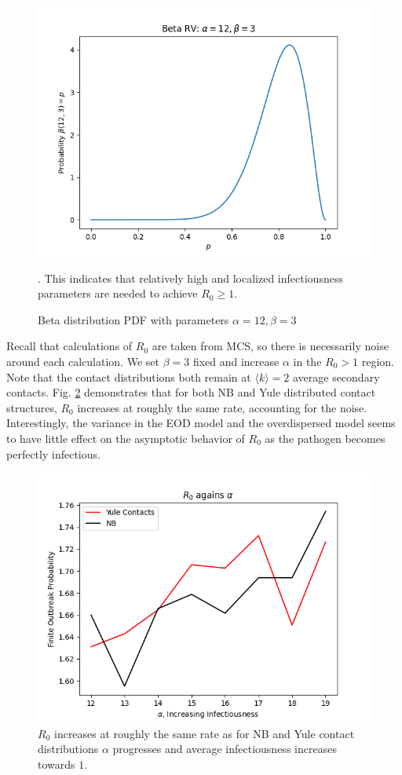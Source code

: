 \documentclass[11pt, twocolumn]{article}
\begin{document}
\begin{figure}
	\centering
	\includegraphics[scale=0.5]{betadist.png}
	\caption{Beta distribution PDF with parameters $\alpha=12, \beta=3$}. This indicates that relatively high and localized infectiousness parameters are needed to achieve $R_0\geq 1$.
	\label{fig:betadist}
\end{figure}

Recall that calculations of $R_0$ are taken from MCS, so there is necessarily noise around each calculation. We set $\beta=3$ fixed and increase $\alpha$ in the $R_0>1$ region. Note that the contact distributions both remain at $\langle k \rangle = 2$ average secondary contacts. Fig. \ref{fig:r0prog} demonstrates that for both NB and Yule distributed contact structures, $R_0$ increases at roughly the same rate, accounting for the noise. Interestingly, the variance in the EOD model and the overdispersed model seems to have little effect on the asymptotic behavior of $R_0$ as the pathogen becomes perfectly infectious.

\begin{figure}
	\centering
	\includegraphics[scale=0.5]{nb_yule_r0.png}
	\caption{$R_0$ increases at roughly the same rate as for NB and Yule contact distributions $\alpha$ progresses and average infectiousness increases towards $1$.}
	\label{fig:r0prog}
\end{figure}
\end{document}

